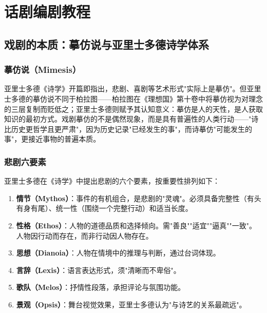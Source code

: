 \chapter{话剧编剧教程}


\section{戏剧的本质：摹仿说与亚里士多德诗学体系}

\subsection{摹仿说（Mimesis）}

亚里士多德《诗学》开篇即指出，悲剧、喜剧等艺术形式"实际上是摹仿"\cite[第1章]{aristotle:poetics}。但亚里士多德的摹仿说不同于柏拉图——柏拉图在《理想国》第十卷中将摹仿视为对理念的三层复制而贬低之；亚里士多德则赋予其认知意义：摹仿是人的天性，是人获取知识的最初方式。戏剧摹仿的不是偶然现象，而是具有普遍性的人类行动——"诗比历史更哲学且更严肃"\cite[第9章]{aristotle:poetics}，因为历史记录"已经发生的事"，而诗摹仿"可能发生的事"，更接近事物的普遍本质。

\subsection{悲剧六要素}

亚里士多德在《诗学》中提出悲剧的六个要素\cite[第6章]{aristotle:poetics}，按重要性排列如下：

\begin{enumerate}
  \item \textbf{情节（Mythos）}：事件的有机组合，是悲剧的"灵魂"。必须具备完整性（有头有身有尾）、统一性（围绕一个完整行动）和适当长度。
  \item \textbf{性格（Ethos）}：人物的道德品质和选择倾向。需"善良""适宜""逼真""一致"。人物因行动而存在，而非行动因人物存在。
  \item \textbf{思想（Dianoia）}：人物在情境中的推理与判断，通过台词体现。
  \item \textbf{言辞（Lexis）}：语言表达形式，须"清晰而不卑俗"。
  \item \textbf{歌队（Melos）}：抒情性段落，承担评论与氛围功能。
  \item \textbf{景观（Opsis）}：舞台视觉效果，亚里士多德认为"与诗艺的关系最疏远"。
\end{enumerate}

